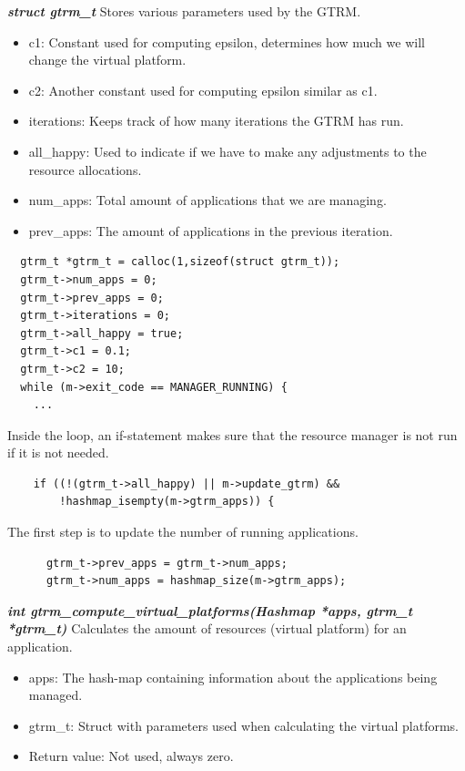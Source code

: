 \documentclass[nobiblatex]{LTHthesis}
\begin{document}
\begin{framed}
		\begin{flushleft}
		
				\textbf{\emph{{struct gtrm\_t}}} \newline
				Stores various parameters used by the GTRM.
				\begin{itemize}
				\item c1: Constant used for computing epsilon, determines how much we will change the virtual platform.
				\item c2: Another constant used for computing epsilon similar as c1.
				\item iterations: Keeps track of how many iterations the GTRM has run.
				\item all\_happy: Used to indicate if we have to make any adjustments to the resource allocations.
				\item num\_apps: Total amount of applications that we are managing.
				\item prev\_apps: The amount of applications in the previous iteration.
				\end{itemize}
		\end{flushleft}	
\end{framed}

\begin{verbatim}
  gtrm_t *gtrm_t = calloc(1,sizeof(struct gtrm_t));
  gtrm_t->num_apps = 0;
  gtrm_t->prev_apps = 0;
  gtrm_t->iterations = 0;
  gtrm_t->all_happy = true;
  gtrm_t->c1 = 0.1;
  gtrm_t->c2 = 10;
  while (m->exit_code == MANAGER_RUNNING) {
    ...
\end{verbatim}
Inside the loop, an if-statement makes sure that the resource manager is not run if it is not needed. 
\begin{verbatim}
    if ((!(gtrm_t->all_happy) || m->update_gtrm) && 
        !hashmap_isempty(m->gtrm_apps)) {
\end{verbatim}
The first step is to update the number of running applications.
\begin{verbatim}
      gtrm_t->prev_apps = gtrm_t->num_apps;
      gtrm_t->num_apps = hashmap_size(m->gtrm_apps);
\end{verbatim}

\begin{framed}
		\begin{flushleft}
				\textbf{\emph{{int gtrm\_compute\_virtual\_platforms(Hashmap *apps, gtrm\_t *gtrm\_t)}}} \newline
				Calculates the amount of resources (virtual platform) for an application.
				\begin{itemize}
				\item apps: The hash-map containing information about the applications being managed.
				\item gtrm\_t: Struct with parameters used when calculating the virtual platforms.
				\item Return value: Not used, always zero.
				\end{itemize}
		\end{flushleft}	
\end{framed}
\end{document}
